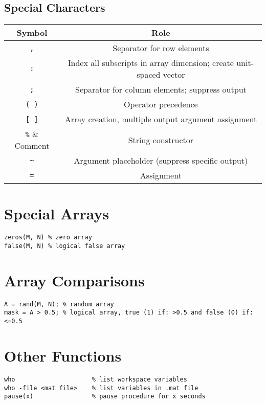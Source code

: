 \documentclass{article}
\begin{document}
\subsection*{Special Characters}
\begin{table}[H]
    \centering
    \begin{tabular}{c | c}
        \toprule
        \textbf{Symbol} & \textbf{Role} \\
        \midrule
        \lstinline!,!   & Separator for row elements \\
        \lstinline!:!   & Index all subscripts in array dimension; create unit-spaced vector \\
        \lstinline!;!   & Separator for column elements; suppress output \\
        \lstinline!( )! & Operator precedence \\
        \lstinline![ ]! & Array creation, multiple output argument assignment \\
        \lstinline!%!   & Comment \\
        \lstinline!""!  & String constructor \\
        \lstinline!~!   & Argument placeholder (suppress specific output) \\
        \lstinline!=!   & Assignment \\
        \bottomrule
    \end{tabular}
\end{table}
\section*{Special Arrays}
\begin{lstlisting}
zeros(M, N) % zero array
false(M, N) % logical false array
\end{lstlisting}
\section*{Array Comparisons}
\begin{lstlisting}
A = rand(M, N); % random array
mask = A > 0.5; % logical array, true (1) if: >0.5 and false (0) if: <=0.5
\end{lstlisting}
\section*{Other Functions}
\begin{lstlisting}
who                     % list workspace variables  
who -file <mat file>    % list variables in .mat file 
pause(x)                % pause procedure for x seconds 
\end{lstlisting}
\end{document}
